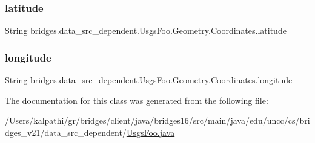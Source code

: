 \hypertarget{classbridges_1_1data__src__dependent_1_1_usgs_foo_1_1_geometry_1_1_coordinates_a8ab648886a19cd5d07f330e1558b8175}{}\label{classbridges_1_1data__src__dependent_1_1_usgs_foo_1_1_geometry_1_1_coordinates_a8ab648886a19cd5d07f330e1558b8175} 
\subsubsection{\texorpdfstring{latitude}{latitude}}
{\footnotesize\ttfamily String bridges.\+data\+\_\+src\+\_\+dependent.\+Usgs\+Foo.\+Geometry.\+Coordinates.\+latitude}

\hypertarget{classbridges_1_1data__src__dependent_1_1_usgs_foo_1_1_geometry_1_1_coordinates_a45f2a0dc4220eb4a1e8ec576101f9633}{}\label{classbridges_1_1data__src__dependent_1_1_usgs_foo_1_1_geometry_1_1_coordinates_a45f2a0dc4220eb4a1e8ec576101f9633} 
\subsubsection{\texorpdfstring{longitude}{longitude}}
{\footnotesize\ttfamily String bridges.\+data\+\_\+src\+\_\+dependent.\+Usgs\+Foo.\+Geometry.\+Coordinates.\+longitude}



The documentation for this class was generated from the following file\+:\begin{DoxyCompactItemize}
\item 
/\+Users/kalpathi/gr/bridges/client/java/bridges16/src/main/java/edu/uncc/cs/bridges\+\_\+v21/data\+\_\+src\+\_\+dependent/\hyperlink{_usgs_foo_8java}{Usgs\+Foo.\+java}\end{DoxyCompactItemize}
